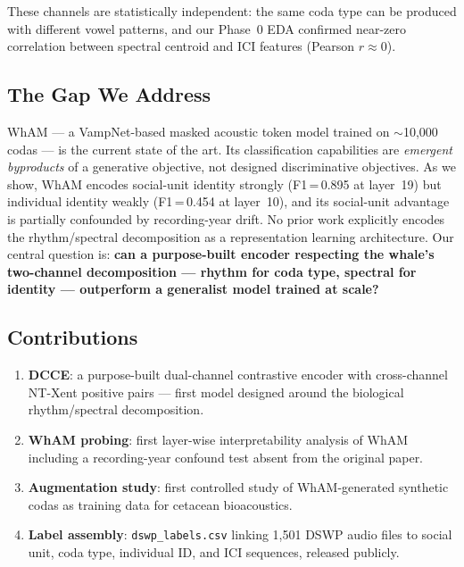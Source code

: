 \documentclass[9pt,a4paper,twocolumn,twoside]{rho-class/rho}
\begin{document}
These channels are statistically independent: the same coda type can be produced with different vowel patterns, and our Phase~0 EDA confirmed near-zero correlation between spectral centroid and ICI features (Pearson $r \approx 0$).

\subsection{The Gap We Address}

WhAM \cite{paradise2025wham} --- a VampNet-based masked acoustic token model trained on $\sim$10,000 codas --- is the current state of the art. Its classification capabilities are \emph{emergent byproducts} of a generative objective, not designed discriminative objectives. As we show, WhAM encodes social-unit identity strongly (F1\,=\,0.895 at layer~19) but individual identity weakly (F1\,=\,0.454 at layer~10), and its social-unit advantage is partially confounded by recording-year drift. No prior work explicitly encodes the rhythm/spectral decomposition as a representation learning architecture. Our central question is: \textbf{can a purpose-built encoder respecting the whale's two-channel decomposition --- rhythm for coda type, spectral for identity --- outperform a generalist model trained at scale?}

\subsection{Contributions}

\begin{enumerate}
    \item \textbf{DCCE}: a purpose-built dual-channel contrastive encoder with cross-channel NT-Xent positive pairs --- first model designed around the biological rhythm/spectral decomposition.
    \item \textbf{WhAM probing}: first layer-wise interpretability analysis of WhAM including a recording-year confound test absent from the original paper.
    \item \textbf{Augmentation study}: first controlled study of WhAM-generated synthetic codas as training data for cetacean bioacoustics.
    \item \textbf{Label assembly}: \texttt{dswp\_labels.csv} linking 1,501 DSWP audio files to social unit, coda type, individual ID, and ICI sequences, released publicly.
\end{enumerate}

\end{document}
